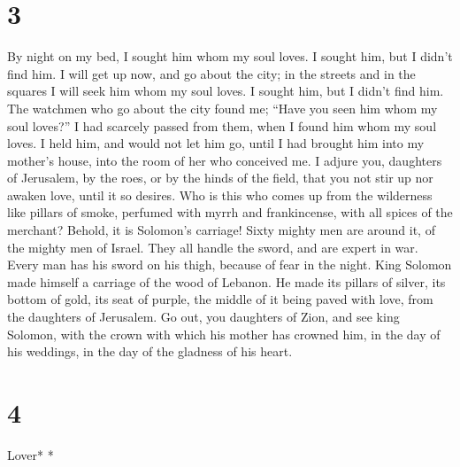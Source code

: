 \hypertarget{section-2}{%
\section{3}\label{section-2}}

 By night on my bed, I sought him whom my soul loves. I
sought him, but I didn't find him.  I will get up now, and
go about the city; in the streets and in the squares I will seek him
whom my soul loves. I sought him, but I didn't find him. 
The watchmen who go about the city found me; ``Have you seen him whom my
soul loves?''  I had scarcely passed from them, when I
found him whom my soul loves. I held him, and would not let him go,
until I had brought him into my mother's house, into the room of her who
conceived me.  I adjure you, daughters of Jerusalem, by
the roes, or by the hinds of the field, that you not stir up nor awaken
love, until it so desires.  Who is this who comes up from
the wilderness like pillars of smoke, perfumed with myrrh and
frankincense, with all spices of the merchant?  Behold, it
is Solomon's carriage! Sixty mighty men are around it, of the mighty men
of Israel.  They all handle the sword, and are expert in
war. Every man has his sword on his thigh, because of fear in the night.
 King Solomon made himself a carriage of the wood of
Lebanon.  He made its pillars of silver, its bottom of
gold, its seat of purple, the middle of it being paved with love, from
the daughters of Jerusalem.  Go out, you daughters of
Zion, and see king Solomon, with the crown with which his mother has
crowned him, in the day of his weddings, in the day of the gladness of
his heart.

\hypertarget{section-3}{%
\section{4}\label{section-3}}

\emph{\hfill\break
}Lover* *\\

